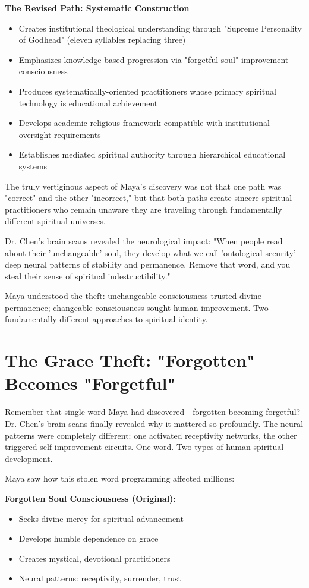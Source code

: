\documentclass[11pt,twoside]{book}
\begin{document}
\textbf{\textbf{The Revised Path: Systematic Construction}}  
\begin{itemize}
\item Creates institutional theological understanding through "Supreme Personality of Godhead" (eleven syllables replacing three)
\item Emphasizes knowledge-based progression via "forgetful soul" improvement consciousness
\item Produces systematically-oriented practitioners whose primary spiritual technology is educational achievement
\item Develops academic religious framework compatible with institutional oversight requirements
\item Establishes mediated spiritual authority through hierarchical educational systems
\end{itemize}

The truly vertiginous aspect of Maya's discovery was not that one path was "correct" and the other "incorrect," but that both paths create sincere spiritual practitioners who remain unaware they are traveling through fundamentally different spiritual universes.

Dr. Chen's brain scans revealed the neurological impact: "When people read about their 'unchangeable' soul, they develop what we call 'ontological security'—deep neural patterns of stability and permanence. Remove that word, and you steal their sense of spiritual indestructibility."

Maya understood the theft: unchangeable consciousness trusted divine permanence; changeable consciousness sought human improvement. Two fundamentally different approaches to spiritual identity.
\section*{The Grace Theft: "Forgotten" Becomes "Forgetful"}
\label{sec:orgfbf8374}

Remember that single word Maya had discovered—forgotten becoming forgetful? Dr. Chen's brain scans finally revealed why it mattered so profoundly. The neural patterns were completely different: one activated receptivity networks, the other triggered self-improvement circuits. One word. Two types of human spiritual development.

Maya saw how this stolen word programming affected millions:

\textbf{\textbf{Forgotten Soul Consciousness (Original):}}
\begin{itemize}
\item Seeks divine mercy for spiritual advancement
\item Develops humble dependence on grace
\item Creates mystical, devotional practitioners
\item Neural patterns: receptivity, surrender, trust
\end{itemize}
\end{document}
